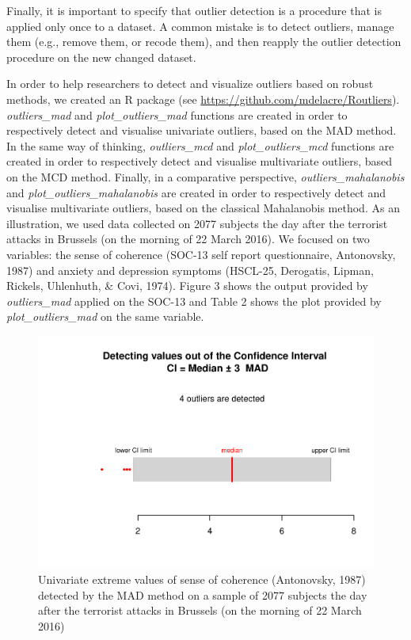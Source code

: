 \documentclass[man,floatsintext]{apa6}
\begin{document}
Finally, it is important to specify that outlier detection is a procedure that is applied only once to a dataset. A common mistake is to detect outliers, manage them (e.g., remove them, or recode them), and then reapply the outlier detection procedure on the new changed dataset.

In order to help researchers to detect and visualize outliers based on robust methods, we created an R package (see \url{https://github.com/mdelacre/Routliers}). \emph{outliers\_mad} and \emph{plot\_outliers\_mad} functions are created in order to respectively detect and visualise univariate outliers, based on the MAD method. In the same way of thinking, \emph{outliers\_mcd} and \emph{plot\_outliers\_mcd} functions are created in order to respectively detect and visualise multivariate outliers, based on the MCD method. Finally, in a comparative perspective, \emph{outliers\_mahalanobis} and \emph{plot\_outliers\_mahalanobis} are created in order to respectively detect and visualise multivariate outliers, based on the classical Mahalanobis method. As an illustration, we used data collected on 2077 subjects the day after the terrorist attacks in Brussels (on the morning of 22 March 2016). We focused on two variables: the sense of coherence (SOC-13 self report questionnaire, Antonovsky, 1987) and anxiety and depression symptoms (HSCL-25, Derogatis, Lipman, Rickels, Uhlenhuth, \& Covi, 1974). Figure 3 shows the output provided by \emph{outliers\_mad} applied on the SOC-13 and Table 2 shows the plot provided by \emph{plot\_outliers\_mad} on the same variable.

\begin{figure}
\centering
\includegraphics{Outliers_files/figure-latex/MADSOC-1.pdf}
\caption{\label{fig:MADSOC}Univariate extreme values of sense of coherence (Antonovsky, 1987) detected by the MAD method on a sample of 2077 subjects the day after the terrorist attacks in Brussels (on the morning of 22 March 2016)}
\end{figure}
\end{document}
